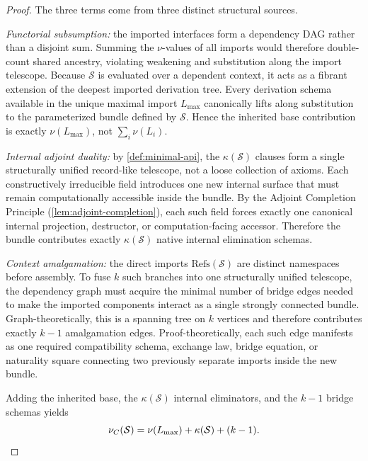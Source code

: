 \documentclass[11pt,a4paper]{article}
\theoremstyle{plain}
\theoremstyle{definition}
\theoremstyle{remark}
\begin{document}
\begin{proof}
The three terms come from three distinct structural sources.

\emph{Functorial subsumption:} the imported interfaces form a dependency DAG rather than a disjoint sum.
Summing the $\nu$-values of all imports would therefore double-count shared ancestry, violating weakening and substitution along the import telescope.
Because $\mathcal{S}$ is evaluated over a dependent context, it acts as a fibrant extension of the deepest imported derivation tree.
Every derivation schema available in the unique maximal import $L_{\max}$ canonically lifts along substitution to the parameterized bundle defined by $\mathcal{S}$.
Hence the inherited base contribution is exactly $\nu(L_{\max})$, not $\sum_i \nu(L_i)$.

\emph{Internal adjoint duality:} by \cref{def:minimal-api}, the $\kappa(\mathcal{S})$ clauses form a single structurally unified record-like telescope, not a loose collection of axioms.
Each constructively irreducible field introduces one new internal surface that must remain computationally accessible inside the bundle.
By the Adjoint Completion Principle (\cref{lem:adjoint-completion}), each such field forces exactly one canonical internal projection, destructor, or computation-facing accessor.
Therefore the bundle contributes exactly $\kappa(\mathcal{S})$ native internal elimination schemas.

\emph{Context amalgamation:} the direct imports $\mathrm{Refs}(\mathcal{S})$ are distinct namespaces before assembly.
To fuse $k$ such branches into one structurally unified telescope, the dependency graph must acquire the minimal number of bridge edges needed to make the imported components interact as a single strongly connected bundle.
Graph-theoretically, this is a spanning tree on $k$ vertices and therefore contributes exactly $k-1$ amalgamation edges.
Proof-theoretically, each such edge manifests as one required compatibility schema, exchange law, bridge equation, or naturality square connecting two previously separate imports inside the new bundle.

Adding the inherited base, the $\kappa(\mathcal{S})$ internal eliminators, and the $k-1$ bridge schemas yields
\[
  \nu_C(\mathcal{S})
  =
  \nu(L_{\max}) + \kappa(\mathcal{S}) + (k-1).
\qedhere
\]
\end{proof}
\end{document}
